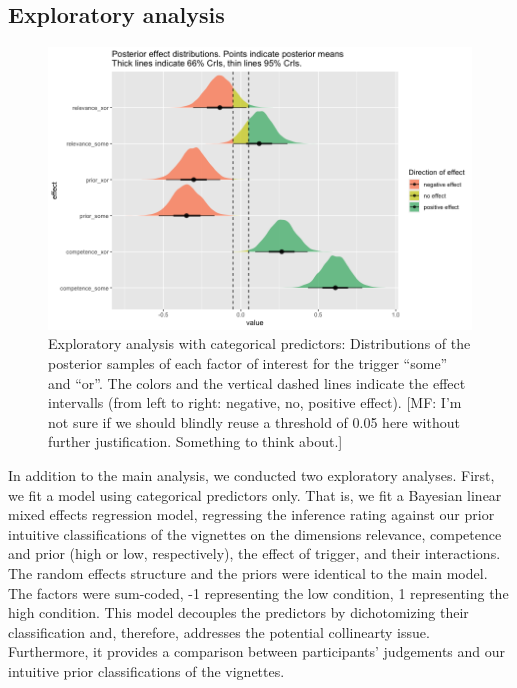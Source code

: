 \documentclass{sp}
\newcommand{\mf}[1]{\textcolor{BurntOrange}{[MF: #1]}}
\begin{document}
\subsection{Exploratory analysis}
\begin{figure}[t]
	\begin{center}
		\includegraphics[width=1\linewidth]{images/posterior-effects-categorical.png}
	\end{center}
	\vspace{-0.3cm}
	\caption{Exploratory analysis with categorical predictors: Distributions of the posterior samples of each factor of interest for the trigger ``some'' and ``or''. The colors and the vertical dashed lines indicate the effect intervalls (from left to right: negative, no, positive effect). \mf{I'm not sure if we should blindly reuse a threshold of 0.05 here without further justification. Something to think about.}}
	\label{posteriors-cat}
\end{figure}
In addition to the main analysis, we conducted two exploratory analyses. First, we fit a model using categorical predictors only. That is, we fit a Bayesian linear mixed effects regression model, regressing the inference rating against our prior intuitive classifications of the vignettes on the dimensions relevance, competence and prior (high or low, respectively), the effect of trigger, and their interactions. The random effects structure and the priors were identical to the main model. The factors were sum-coded, -1 representing the low condition, 1 representing the high condition. 
This model decouples the predictors by dichotomizing their classification and, therefore, addresses the potential collinearty issue. Furthermore, it provides a comparison between participants' judgements and our intuitive prior classifications of the vignettes. 
\end{document}
